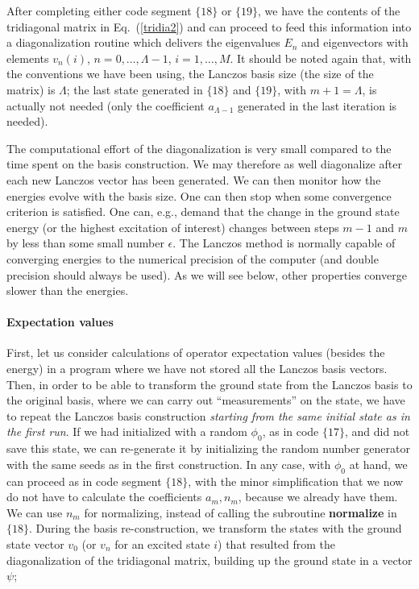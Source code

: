 \documentclass[draft,numberedheadings]{aipproc}
\begin{document}
\noindent
After completing either code segment $\{18\}$ or $\{19\}$, we have the contents of the tridiagonal matrix in Eq.~(\ref{tridia2}) and can proceed to feed 
this information into a diagonalization routine which delivers the eigenvalues $E_n$ and eigenvectors with elements $v_n(i)$, $n=0,\ldots,\Lambda-1$,
$i=1,\ldots,M$. It should be noted again that, with the conventions we have been using, the Lanczos basis size (the size of the matrix) is $\Lambda$; the last state
generated in $\{18\}$ and $\{19\}$, with $m+1=\Lambda$, is actually not needed (only the coefficient $a_{\Lambda-1}$ generated in the last iteration is needed).

The computational effort of the diagonalization is very small compared to the time spent on the basis construction. We may therefore as well diagonalize after each 
new Lanczos vector has been generated. We can then monitor how the energies evolve with the basis size. One can then stop when some convergence criterion is 
satisfied. One can, e.g., demand that the change in the ground state energy (or the highest excitation of interest) changes between steps $m-1$ and $m$ by less 
than some small number $\epsilon$. The Lanczos method is normally capable of converging energies to the numerical precision of the computer (and double 
precision should always be used). As we will see below, other properties converge slower than the energies.

\paragraph{Expectation values}

First, let us consider calculations of operator expectation values (besides the energy) in a program where we have not stored all the Lanczos basis vectors. 
Then, in order to be able to transform the ground state from the Lanczos basis to the original basis, where we can carry out ``measurements'' on the state,
we have to repeat the Lanczos basis construction {\it starting from the same initial state as in the first run}. If we had initialized with a random $\phi_0$, 
as in code $\{17\}$, and did not save this state, we can re-generate it by initializing the random number generator with the same seeds as in the first 
construction. In any case, with $\phi_0$ at hand, we can proceed as in code segment $\{18\}$, with the minor simplification that we now do not 
have to calculate the coefficients $a_m,n_m$, because we already have them. We can use $n_m$ for normalizing, instead of calling the subroutine {\bf normalize}
in $\{18\}$. During the basis re-construction, we transform the states with the ground state vector $v_0$ (or $v_n$ for an excited state $i$) that 
resulted from the diagonalization of the tridiagonal matrix, building up the ground state in a vector $\psi$;
 
\end{document}
